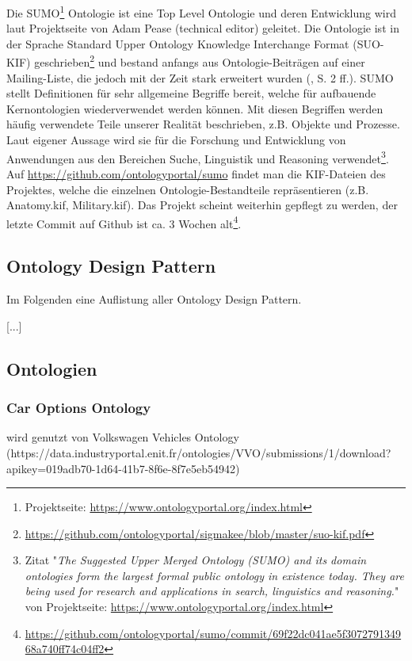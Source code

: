 \documentclass{article}
\begin{document}
Die SUMO\footnote{Projektseite: \url{https://www.ontologyportal.org/index.html}} Ontologie ist eine Top Level Ontologie und deren Entwicklung wird laut Projektseite von Adam Pease (technical editor) geleitet.
Die Ontologie ist in der Sprache Standard Upper Ontology Knowledge Interchange Format (SUO-KIF) geschrieben\footnote{\url{https://github.com/ontologyportal/sigmakee/blob/master/suo-kif.pdf}} und
bestand anfangs aus Ontologie-Beiträgen auf einer Mailing-Liste, die jedoch mit der Zeit stark erweitert wurden (\cite{niles2001towards}, S. 2 ff.).
SUMO stellt Definitionen für sehr allgemeine Begriffe bereit, welche für aufbauende Kernontologien wiederverwendet werden können.
Mit diesen Begriffen werden häufig verwendete Teile unserer Realität beschrieben, z.B. Objekte und Prozesse.
Laut eigener Aussage wird sie für die Forschung und Entwicklung von Anwendungen aus den Bereichen Suche, Linguistik und Reasoning verwendet\footnote{Zitat "\textit{The Suggested Upper Merged Ontology (SUMO) and its domain ontologies form the largest formal public ontology in existence today. They are being used for research and applications in search, linguistics and reasoning.}" von Projektseite: \url{https://www.ontologyportal.org/index.html}}.
Auf \url{https://github.com/ontologyportal/sumo} findet man die KIF-Dateien des Projektes, welche die einzelnen Ontologie-Bestandteile repräsentieren (z.B. Anatomy.kif, Military.kif).
Das Projekt scheint weiterhin gepflegt zu werden, der letzte Commit auf Github ist ca. 3 Wochen alt\footnote{\url{https://github.com/ontologyportal/sumo/commit/69f22dc041ae5f307279134968a740ff74c04ff2}}.

\subsection{Ontology Design Pattern}

Im Folgenden eine Auflistung aller Ontology Design Pattern.

[...]

\subsection{Ontologien}


\subsubsection{Car Options Ontology}

wird genutzt von Volkswagen Vehicles Ontology (https://data.industryportal.enit.fr/ontologies/VVO/submissions/1/download?apikey=019adb70-1d64-41b7-8f6e-8f7e5eb54942)
\end{document}
